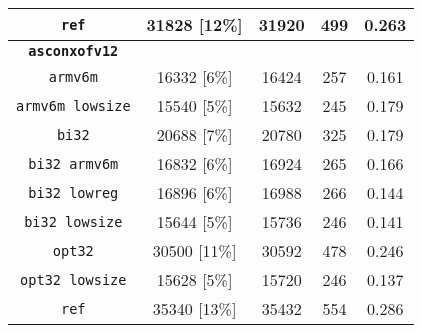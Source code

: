 \begin{table}[h]
\begin{adjustbox}{width=207pt}
\begin{tabular}{|c|c|c|c|c|}
        \hline
        \texttt{ref} & 31828 [12\%] & 31920 & 499 & 0.263 \\
        \hline
        \texttt{\textbf{asconxofv12}} & & & & \\
        \hline
        \texttt{armv6m} & 16332 [6\%] & 16424 & 257 & 0.161 \\
        \hline
        \texttt{armv6m lowsize} & 15540 [5\%] & 15632 & 245 & 0.179 \\
        \hline
        \texttt{bi32} & 20688 [7\%] & 20780 & 325 & 0.179 \\
        \hline
        \texttt{bi32 armv6m} & 16832 [6\%] & 16924 & 265 & 0.166 \\
        \hline
        \texttt{bi32 lowreg} & 16896 [6\%] & 16988 & 266 & 0.144 \\
        \hline
        \texttt{bi32 lowsize} & 15644 [5\%] & 15736 & 246 & 0.141 \\
        \hline
        \texttt{opt32} & 30500 [11\%] & 30592 & 478 & 0.246 \\
        \hline
        \texttt{opt32 lowsize} & 15628 [5\%] & 15720 & 246 & 0.137 \\
        \hline
        \texttt{ref} & 35340 [13\%] & 35432 & 554 & 0.286 \\
        \hline
    \end{tabular}
    \end{adjustbox}
\end{table}

